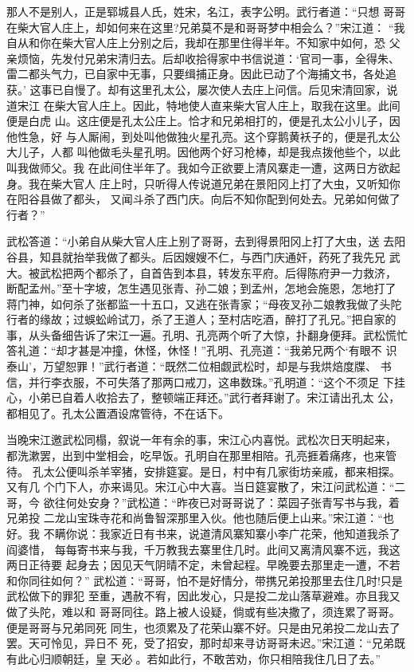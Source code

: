 那人不是别人，正是郓城县人氏，姓宋，名江，表字公明。武行者道：“只想
哥哥在柴大官人庄上，却如何来在这里?兄弟莫不是和哥哥梦中相会么？”宋江道：
“我自从和你在柴大官人庄上分别之后，我却在那里住得半年。不知家中如何，恐
父亲烦恼，先发付兄弟宋清归去。后却收拾得家中书信说道：‘官司一事，全得朱、
雷二都头气力，已自家中无事，只要缉捕正身。因此已动了个海捕文书，各处追获。’
这事已自慢了。却有这里孔太公，屡次使人去庄上问信。后见宋清回家，说道宋江
在柴大官人庄上。因此，特地使人直来柴大官人庄上，取我在这里。此间便是白虎
山。这庄便是孔太公庄上。恰才和兄弟相打的，便是孔太公小儿子，因他性急，好
与人厮闹，到处叫他做独火星孔亮。这个穿鹅黄袄子的，便是孔太公大儿子，人都
叫他做毛头星孔明。因他两个好习枪棒，却是我点拨他些个，以此叫我做师父。我
在此间住半年了。我如今正欲要上清风寨走一遭，这两日方欲起身。我在柴大官人
庄上时，只听得人传说道兄弟在景阳冈上打了大虫，又听知你在阳谷县做了都头，
又闻斗杀了西门庆。向后不知你配到何处去。兄弟如何做了行者？”

武松答道：“小弟自从柴大官人庄上别了哥哥，去到得景阳冈上打了大虫，送
去阳谷县，知县就抬举我做了都头。后因嫂嫂不仁，与西门庆通奸，药死了我先兄
武大。被武松把两个都杀了，自首告到本县，转发东平府。后得陈府尹一力救济，
断配孟州。”至十字坡，怎生遇见张青、孙二娘；到孟州，怎地会施恩，怎地打了
蒋门神，如何杀了张都监一十五口，又逃在张青家；“母夜叉孙二娘教我做了头陀
行者的缘故；过蜈蚣岭试刀，杀了王道人；至村店吃酒，醉打了孔兄。”把自家的
事，从头备细告诉了宋江一遍。孔明、孔亮两个听了大惊，扑翻身便拜。武松慌忙
答礼道：“却才甚是冲撞，休怪，休怪！”孔明、孔亮道：“我弟兄两个‘有眼不
识泰山’，万望恕罪！”武行者道：“既然二位相觑武松时，却是与我烘焙度牒、
书信，并行李衣服，不可失落了那两口戒刀，这串数珠。”孔明道：“这个不须足
下挂心，小弟已自着人收拾去了，整顿端正拜还。”武行者拜谢了。宋江请出孔太
公，都相见了。孔太公置酒设席管待，不在话下。

当晚宋江邀武松同榻，叙说一年有余的事，宋江心内喜悦。武松次日天明起来，
都洗漱罢，出到中堂相会，吃早饭。孔明自在那里相陪。孔亮捱着痛疼，也来管待。
孔太公便叫杀羊宰猪，安排筵宴。是日，村中有几家街坊亲戚，都来相探。又有几
个门下人，亦来谒见。宋江心中大喜。当日筵宴散了，宋江问武松道：“二哥，今
欲往何处安身？”武松道：“昨夜已对哥哥说了：菜园子张青写书与我，着兄弟投
二龙山宝珠寺花和尚鲁智深那里入伙。他也随后便上山来。”宋江道：“也好。我
不瞒你说：我家近日有书来，说道清风寨知寨小李广花荣，他知道我杀了阎婆惜，
每每寄书来与我，千万教我去寨里住几时。此间又离清风寨不远，我这两日正待要
起身去；因见天气阴晴不定，未曾起程。早晚要去那里走一遭，不若和你同往如何？”
武松道：“哥哥，怕不是好情分，带携兄弟投那里去住几时!只是武松做下的罪犯
至重，遇赦不宥，因此发心，只是投二龙山落草避难。亦且我又做了头陀，难以和
哥哥同往。路上被人设疑，倘或有些决撒了，须连累了哥哥。便是哥哥与兄弟同死
同生，也须累及了花荣山寨不好。只是由兄弟投二龙山去了罢。天可怜见，异日不
死，受了招安，那时却来寻访哥哥未迟。”宋江道：“兄弟既有此心归顺朝廷，皇
天必。若如此行，不敢苦劝，你只相陪我住几日了去。”

